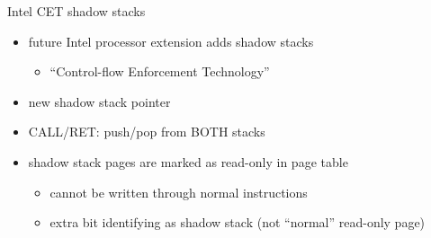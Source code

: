 \begin{frame}{Intel CET shadow stacks}
    \begin{itemize}
    \item future Intel processor extension adds shadow stacks
        \begin{itemize}
        \item ``Control-flow Enforcement Technology''
        \end{itemize}
    \vspace{.5cm}
    \item new shadow stack pointer
    \item CALL/RET: push/pop from BOTH stacks
    \item shadow stack pages are marked as read-only in page table
        \begin{itemize}
        \item cannot be written through normal instructions
        \item extra bit identifying as shadow stack (not ``normal'' read-only page)
        \end{itemize}
    \end{itemize}
\end{frame}
